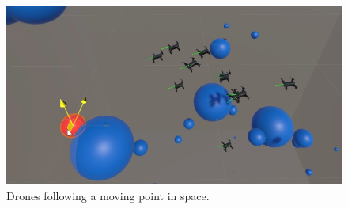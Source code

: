 \begin{figure}[htbp]
    \centerline{\includegraphics{images/dronesUnity.png}}
    \caption{ Drones following a moving point in space. }
    \label{fig}
    \end{figure}	


